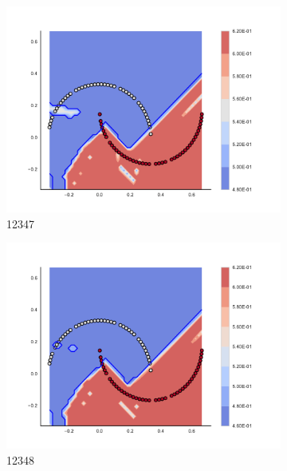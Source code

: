 \begin{figure}[h]
\begin{subfigure}[b]{0.09\textwidth}
    \includegraphics[clip, trim=2.35cm 1.75cm 4.5cm 0cm,width=\textwidth]{img/convergence/12347.pdf}
    \caption{12347}
    \label{fig:convergence_12347}
\end{subfigure}
%
\begin{subfigure}[b]{0.09\textwidth}
    \includegraphics[clip, trim=2.35cm 1.75cm 4.5cm 0cm,width=\textwidth]{img/convergence/12348.pdf}
    \caption{12348}
    \label{fig:convergence_12348}
\end{subfigure}
%
\begin{subfigure}[b]{0.09\textwidth}

\end{subfigure}
\end{figure}
